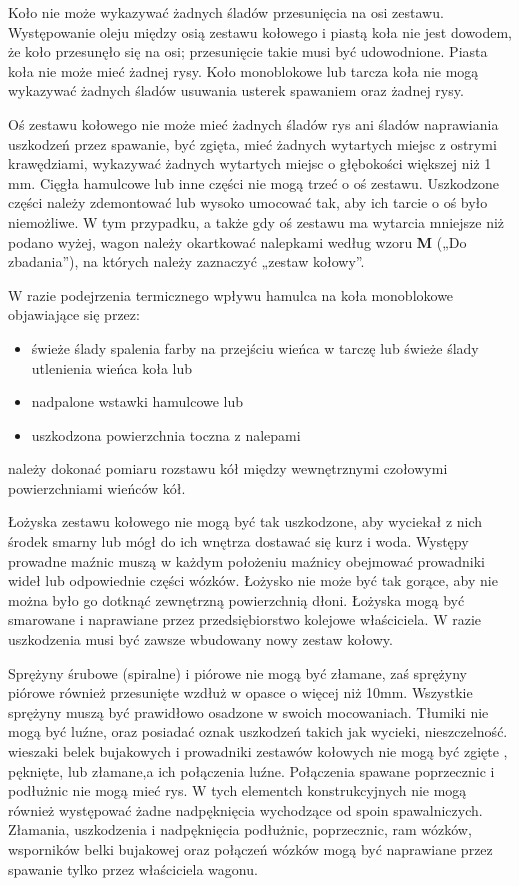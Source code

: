 Koło nie może wykazywać żadnych śladów przesunięcia na osi zestawu. Występowanie oleju między osią zestawu kołowego i piastą koła nie jest dowodem, że koło przesunęło się na osi; przesunięcie takie musi być udowodnione.
Piasta koła nie może mieć żadnej rysy. Koło monoblokowe lub tarcza koła nie mogą wykazywać żadnych śladów usuwania usterek spawaniem oraz żadnej rysy.

Oś zestawu kołowego nie może mieć żadnych śladów rys ani śladów naprawiania uszkodzeń przez spawanie, być zgięta, mieć żadnych wytartych miejsc z ostrymi krawędziami, wykazywać żadnych wytartych miejsc o głębokości większej niż 1 mm. Cięgła hamulcowe lub inne części nie mogą trzeć o oś zestawu. Uszkodzone części należy zdemontować lub wysoko umocować tak, aby ich tarcie o oś było niemożliwe. W tym przypadku, a także gdy oś zestawu ma wytarcia mniejsze niż podano wyżej, wagon należy okartkować nalepkami według wzoru \textbf{M} („Do zbadania”), na których należy zaznaczyć „zestaw kołowy”.

W razie podejrzenia termicznego wpływu hamulca na koła monoblokowe objawiające się przez:
\begin{itemize}
	\item świeże ślady spalenia farby na przejściu wieńca w tarczę lub świeże ślady utlenienia wieńca koła lub
	\item nadpalone wstawki hamulcowe lub
	\item uszkodzona powierzchnia toczna z nalepami
\end{itemize}
należy dokonać pomiaru rozstawu kół między wewnętrznymi czołowymi powierzchniami wieńców kół.
 
Łożyska zestawu kołowego nie mogą być tak uszkodzone, aby wyciekał z nich środek smarny lub mógł do ich wnętrza dostawać się kurz i woda. Występy prowadne maźnic muszą w każdym położeniu maźnicy obejmować prowadniki wideł lub odpowiednie części wózków. Łożysko nie może być tak gorące, aby nie można było go dotknąć zewnętrzną powierzchnią dłoni. Łożyska mogą być smarowane i naprawiane przez przedsiębiorstwo kolejowe właściciela. W razie uszkodzenia musi być zawsze wbudowany nowy zestaw kołowy.

Sprężyny śrubowe (spiralne) i piórowe nie mogą być złamane, zaś sprężyny piórowe również przesunięte wzdłuż w opasce o więcej niż 10mm. Wszystkie sprężyny muszą być prawidłowo osadzone w swoich mocowaniach. Tłumiki nie mogą być luźne, oraz posiadać oznak uszkodzeń takich jak wycieki, nieszczelność. wieszaki belek bujakowych i prowadniki zestawów kołowych nie mogą być zgięte , pęknięte, lub złamane,a ich połączenia luźne. Połączenia spawane poprzecznic i podłużnic nie mogą mieć rys. W tych elementch konstrukcyjnych nie mogą również występować żadne nadpęknięcia wychodzące od spoin spawalniczych.
Złamania, uszkodzenia i nadpęknięcia podłużnic, poprzecznic, ram wózków, wsporników belki bujakowej oraz połączeń wózków mogą być naprawiane przez spawanie tylko przez właściciela wagonu.

